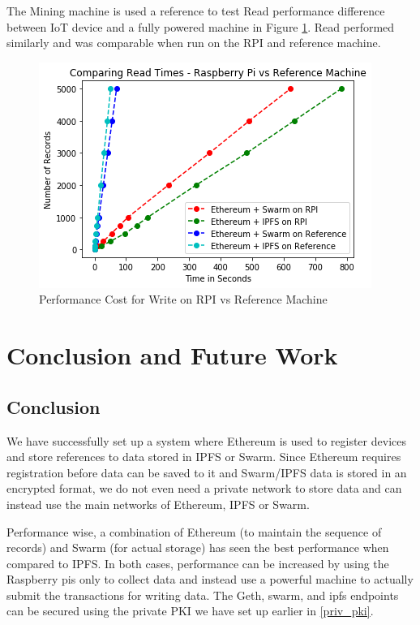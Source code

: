 \documentclass[11pt,openright]{report}
\begin{document}
The Mining machine is used a reference to test Read performance difference between IoT device and a fully powered machine in Figure \ref{fig:graph_perf_cost_read_pi_ref}. Read performed similarly and was comparable when run on the RPI and reference machine.

\begin{figure}
    \centering
    \includegraphics[scale=1]{results/graphs/ReadComp_Pi_v_Ref.png}
    \caption{Performance Cost for Write on RPI vs Reference Machine}
    \label{fig:graph_perf_cost_read_pi_ref}
\end{figure}

\chapter{Conclusion and Future Work} \label{chapter:conclusion}
\section{Conclusion}
We have successfully set up a system where Ethereum is used to register devices and store references to data stored in IPFS or Swarm. Since Ethereum requires registration before data can be saved to it and Swarm/IPFS data is stored in an encrypted format, we do not even need a private network to store data and can instead use the main networks of Ethereum, IPFS or Swarm.

Performance wise, a combination of Ethereum (to maintain the sequence of records) and Swarm (for actual storage) has seen the best performance when compared to IPFS. In both cases, performance can be increased by using the Raspberry pis only to collect data and instead use a powerful machine to actually submit the transactions for writing data. The Geth, swarm, and ipfs endpoints can be secured using the private PKI we have set up earlier in \ref{priv_pki}.
\end{document}
